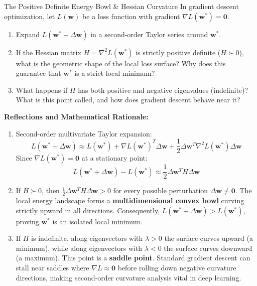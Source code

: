 \begin{ponderbox}{The Positive Definite Energy Bowl \& Hessian Curvature}
In gradient descent optimization, let $L(\mathbf{w})$ be a loss function with gradient $\nabla L(\mathbf{w}^*) = \mathbf{0}$.
\begin{enumerate}
    \item Expand $L(\mathbf{w}^* + \Delta \mathbf{w})$ in a second-order Taylor series around $\mathbf{w}^*$.
    \item If the Hessian matrix $H = \nabla^2 L(\mathbf{w}^*)$ is strictly positive definite ($H \succ 0$), what is the geometric shape of the local loss surface? Why does this guarantee that $\mathbf{w}^*$ is a strict local minimum?
    \item What happens if $H$ has both positive and negative eigenvalues (indefinite)? What is this point called, and how does gradient descent behave near it?
\end{enumerate}
\tcblower
\textbf{Reflections and Mathematical Rationale:}
\begin{enumerate}
    \item Second-order multivariate Taylor expansion:
    \begin{equation*}
    L(\mathbf{w}^* + \Delta \mathbf{w}) \approx L(\mathbf{w}^*) + \nabla L(\mathbf{w}^*)^T \Delta \mathbf{w} + \frac{1}{2} \Delta \mathbf{w}^T \nabla^2 L(\mathbf{w}^*) \Delta \mathbf{w}
    \end{equation*}
    Since $\nabla L(\mathbf{w}^*) = \mathbf{0}$ at a stationary point:
    \begin{equation*}
    L(\mathbf{w}^* + \Delta \mathbf{w}) - L(\mathbf{w}^*) \approx \frac{1}{2} \Delta \mathbf{w}^T H \Delta \mathbf{w}
    \end{equation*}
    \item If $H \succ 0$, then $\frac{1}{2} \Delta \mathbf{w}^T H \Delta \mathbf{w} > 0$ for every possible perturbation $\Delta \mathbf{w} \ne \mathbf{0}$. The local energy landscape forms a \textbf{multidimensional convex bowl} curving strictly upward in all directions. Consequently, $L(\mathbf{w}^* + \Delta \mathbf{w}) > L(\mathbf{w}^*)$, proving $\mathbf{w}^*$ is an isolated local minimum.
    \item If $H$ is indefinite, along eigenvectors with $\lambda > 0$ the surface curves upward (a minimum), while along eigenvectors with $\lambda < 0$ the surface curves downward (a maximum). This point is a \textbf{saddle point}. Standard gradient descent can stall near saddles where $\nabla L \approx \mathbf{0}$ before rolling down negative curvature directions, making second-order curvature analysis vital in deep learning.
\end{enumerate}
\end{ponderbox}

